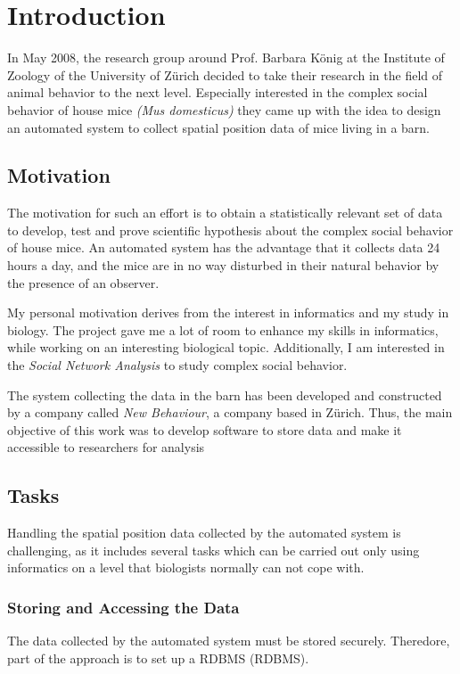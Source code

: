 \newpage

\section{Introduction}
\label{sec:introduction}

In May 2008, the research group around Prof. Barbara K\"onig at the Institute of Zoology of the University of Z\"urich decided to take their research in the field of animal behavior to the next level. Especially interested in the complex social behavior of house mice \textit{(Mus domesticus)} they came up with the idea to design an automated system to collect spatial position data of mice living in a barn.

\subsection{Motivation}
\label{subsec:motivation}
The motivation for such an effort is to obtain a statistically relevant set of data to develop, test and prove scientific hypothesis about the complex social behavior of house mice. An automated system has the advantage that it collects data 24 hours a day, and the mice are in no way disturbed in their natural behavior by the presence of an observer.

My personal motivation derives from the interest in informatics and my study in biology. The project gave me a lot of room to enhance my skills in informatics, while working on an interesting biological topic. Additionally, I am interested in the \textit{Social Network Analysis} to study complex social behavior.

The system collecting the data in the barn has been developed and constructed by a company called \textit{New Behaviour}, a company based in Z\"urich. Thus, the main objective of this work was to develop software to store data and make it accessible to researchers for analysis 

\subsection{Tasks}
\label{subsec:task}
Handling the spatial position data collected by the automated system is challenging, as it includes several tasks which can be carried out only using informatics on a level that biologists normally can not cope with.

\subsubsection{Storing and Accessing the Data}
\label{subsubsec:storeaccess}
The data collected by the automated system must be stored securely. Theredore, part of the approach is to set up a \ac{RDBMS} (RDBMS). 

